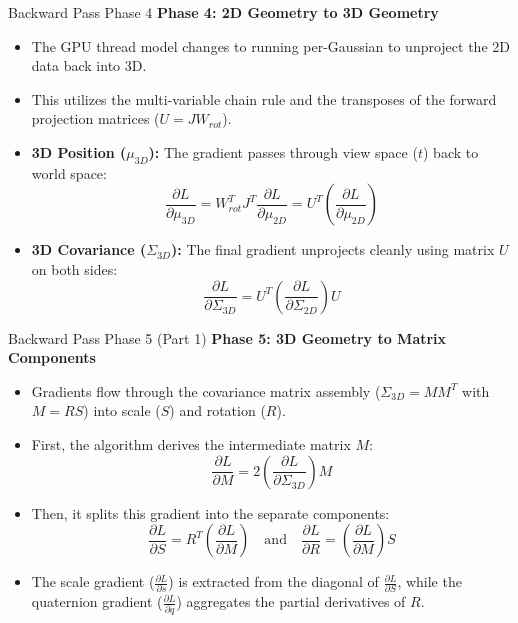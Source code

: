 \begin{frame}{Backward Pass Phase 4}
    \textbf{Phase 4: 2D Geometry to 3D Geometry}
    \begin{itemize}
        \item The GPU thread model changes to running per-Gaussian to unproject the 2D data back into 3D.
        \item This utilizes the multi-variable chain rule and the transposes of the forward projection matrices ($U = JW_{rot}$).
        \item \textbf{3D Position ($\mu_{3D}$):} The gradient passes through view space ($t$) back to world space:
        $$ \frac{\partial L}{\partial \mu_{3D}} = W_{rot}^T J^T \frac{\partial L}{\partial \mu_{2D}} = U^T \left( \frac{\partial L}{\partial \mu_{2D}} \right) $$
        \item \textbf{3D Covariance ($\Sigma_{3D}$):} The final gradient unprojects cleanly using matrix $U$ on both sides:
        $$ \frac{\partial L}{\partial \Sigma_{3D}} = U^T \left( \frac{\partial L}{\partial \Sigma_{2D}} \right) U $$
    \end{itemize}
\end{frame}

\begin{frame}{Backward Pass Phase 5 (Part 1)}
    \textbf{Phase 5: 3D Geometry to Matrix Components}
    \begin{itemize}
        \item Gradients flow through the covariance matrix assembly ($\Sigma_{3D} = MM^T$ with $M = RS$) into scale ($S$) and rotation ($R$).
        \item First, the algorithm derives the intermediate matrix $M$:
        $$ \frac{\partial L}{\partial M} = 2 \left( \frac{\partial L}{\partial \Sigma_{3D}} \right) M $$
        \item Then, it splits this gradient into the separate components:
        $$ \frac{\partial L}{\partial S} = R^T \left( \frac{\partial L}{\partial M} \right) \quad \text{and} \quad \frac{\partial L}{\partial R} = \left( \frac{\partial L}{\partial M} \right) S $$
        \item The scale gradient ($\frac{\partial L}{\partial s}$) is extracted from the diagonal of $\frac{\partial L}{\partial S}$, while the quaternion gradient ($\frac{\partial L}{\partial q}$) aggregates the partial derivatives of $R$.
    \end{itemize}
\end{frame}


